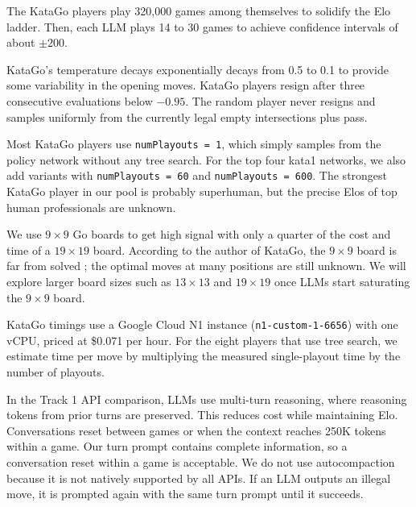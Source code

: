 \documentclass{article}
\begin{document}
The KataGo players play 320,000 games among themselves to solidify the Elo ladder.
Then, each LLM plays 14 to 30 games to achieve confidence intervals of about $\pm200$.

KataGo's temperature decays exponentially decays from 0.5 to 0.1 to provide some variability in the opening moves.
KataGo players resign after three consecutive evaluations below $-0.95$. The random player never resigns and samples uniformly from the currently legal empty intersections plus pass.

Most KataGo players use \texttt{numPlayouts = 1}, which simply samples from the policy network without any tree search.
For the top four kata1 networks, we also add variants with \texttt{numPlayouts = 60} and
\texttt{numPlayouts = 600}. The strongest KataGo player in our
pool is probably superhuman, but the precise Elos of top human professionals are unknown.

We use $9\times9$ Go boards to get high signal with only a quarter of the cost and time of a $19\times19$ board.
According to the author of KataGo, the $9\times9$ board is far from solved \citep{wu2023katagobooks}; the optimal moves at many positions are still unknown.
We will explore larger board sizes such as $13\times13$ and $19\times19$ once LLMs start saturating the $9\times9$ board.

KataGo timings use a Google Cloud N1 instance (\texttt{n1-custom-1-6656})
with one vCPU, priced at \$0.071 per hour. For the eight players
that use tree search, we estimate time per move by multiplying the measured
single-playout time by the number of playouts.

In the Track 1 API comparison, LLMs use multi-turn reasoning, where reasoning tokens from prior turns are preserved.
This reduces cost while maintaining Elo.
Conversations reset between games or when the context reaches 250K tokens within a game.
Our turn prompt contains complete information, so a conversation reset within a game is acceptable.
We do not use autocompaction because it is not natively supported by all APIs.
If an LLM outputs an illegal move, it is prompted again with the same turn prompt until it succeeds.
\end{document}
